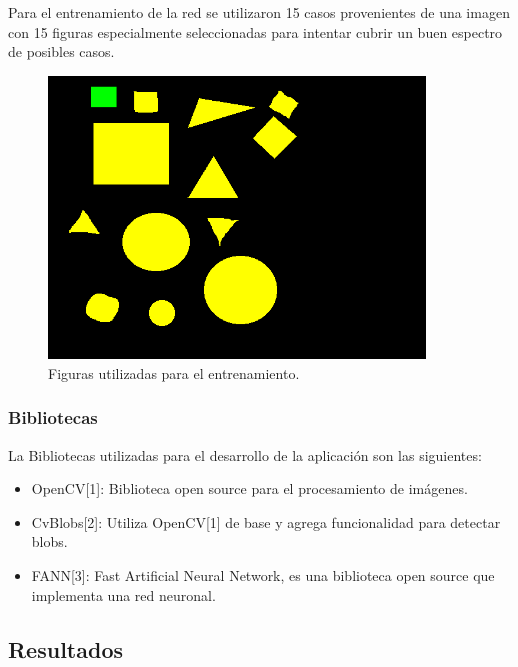 \documentclass[pdftex,a4paper,12pt]{article}
\begin{document}
Para el entrenamiento de la red se utilizaron 15 casos provenientes de una imagen con 15 figuras especialmente seleccionadas para intentar cubrir un buen espectro de posibles casos.
   
             \begin{figure}[H]
	                  \begin{center}
	                    \includegraphics[width=10cm]{prueba2.png}
	                    \caption{\label{image_soleil} Figuras utilizadas para el entrenamiento. }
	                  \end{center}
	            \end{figure}




\subsubsection{Bibliotecas}
La Bibliotecas utilizadas para el desarrollo de la aplicaci\'on son las
siguientes:
\begin{itemize}
	\item	OpenCV[1]: Biblioteca open source para el procesamiento de im\'agenes.
	\item	CvBlobs[2]: Utiliza OpenCV[1] de base y agrega funcionalidad para
	detectar blobs.
	\item	FANN[3]: Fast Artificial Neural Network, es una biblioteca open source
	que implementa una red neuronal.
\end{itemize}
       

\subsection{Resultados} %
\end{document}
